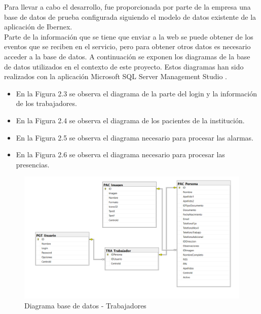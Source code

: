 
Para llevar a cabo el desarrollo, fue proporcionada por parte de la empresa una base de datos de prueba configurada siguiendo el modelo de datos existente de la aplicación de Ibernex.\\

Parte de la información que se tiene que enviar a la web se puede obtener de los eventos que se reciben en el servicio, pero para obtener otros datos es necesario acceder a la base de datos. A continuación se exponen los diagramas de la base de datos utilizados en el contexto de este proyecto. Estos diagramas han sido realizados con la aplicación Microsoft SQL Server Management Studio \cite{sql-server-studio}.

\begin{itemize}
	\item En la Figura 2.3 se observa el diagrama de la parte del login y la información de los trabajadores.
	\item En la Figura 2.4 se observa el diagrama de los pacientes de la institución.
	\item En la Figura 2.5 se observa el diagrama necesario para procesar las alarmas.
	\item En la Figura 2.6 se observa el diagrama necesario para procesar las presencias.
\end{itemize}

\begin{figure}[H]
    \centering
    \includegraphics[width=15cm]{Imagenes/Diagrama-BD-Login}
    \caption{Diagrama base de datos - Trabajadores}
    \label{fig:Diagrama-BD-Login}
\end{figure}

